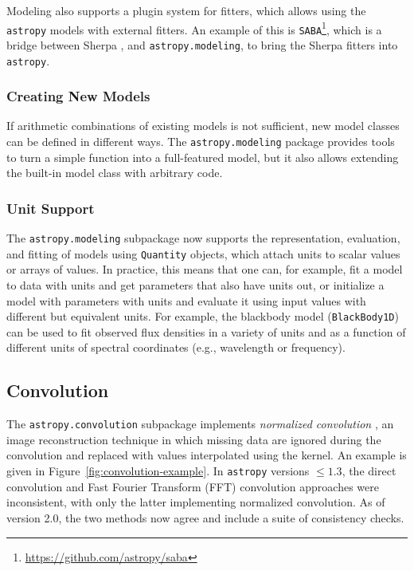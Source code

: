 \documentclass[modern]{aastex62}
\newcommand{\package}[1]{\texttt{#1}\xspace}
\newcommand{\astropypkg}{\package{astropy}}
\renewcommand{\figurename}{Figure\xspace}
\begin{document}
Modeling also supports a plugin system for fitters, which allows using the
\astropypkg models with external fitters. An example of this is
\package{SABA}\footnote{\url{https://github.com/astropy/saba}}, which is a bridge between
Sherpa \citep{sherpa},
and \package{astropy.modeling}, to bring the Sherpa fitters into \astropypkg.

\subsubsection{Creating New Models}
If arithmetic combinations of existing models is not sufficient, new model
classes can be defined in different ways. The \package{astropy.modeling}
package provides tools to turn a simple function into a full-featured model,
but it also allows extending the built-in model class with arbitrary code.

\subsubsection{Unit Support}

The \package{astropy.modeling} subpackage now supports the representation,
evaluation, and fitting of models using \texttt{Quantity} objects, which attach
units to scalar values or arrays of values. In practice, this means that one
can, for example, fit a model to data with units and get parameters that also
have units out, or initialize a model with parameters with units and evaluate
it using input values with different but equivalent units. For example, the
blackbody model (\texttt{BlackBody1D}) can be used to fit observed flux
densities in a variety of units and as a function of different units of
spectral coordinates (e.g., wavelength or frequency).

\subsection{Convolution}

The \package{astropy.convolution} subpackage implements
\textit{normalized convolution} \citep[e.g.,][]{Knutsson1993}, an image
reconstruction technique in which missing data are ignored during the
convolution and replaced with values interpolated using the kernel.
An example is given in \figurename~\ref{fig:convolution-example}.
In \astropypkg versions $\leq 1.3$, the direct convolution and Fast Fourier Transform (FFT)
convolution approaches were inconsistent, with only the latter implementing
normalized convolution.
As of version 2.0, the two methods now agree and include a suite of
consistency checks.
\end{document}
